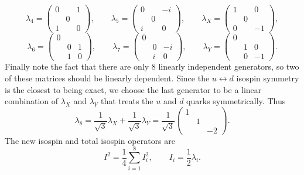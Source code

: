 \begin{equation}
  \lambda_4=\left(\begin{array}{ccc}
            0 &   & 1\\
              & 0 &  \\
            1 &   & 0
            \end{array}\right), \qquad
  \lambda_5=\left(\begin{array}{ccc}
            0 &    & -i \\
              & 0  &    \\
            i &    & 0
            \end{array}\right), \qquad
  \lambda_X=\left(\begin{array}{ccc}
            1 &    & 0 \\
              & 0  &   \\
            0 &    & -1
            \end{array}\right),
\end{equation}
\begin{equation}
  \lambda_6=\left(\begin{array}{ccc}
            0 &   &  \\
              & 0 & 1\\
              & 1 & 0
            \end{array}\right), \qquad
  \lambda_7=\left(\begin{array}{ccc}
            0 &    &   \\
              & 0  & -i\\
              & i  & 0
            \end{array}\right), \qquad
  \lambda_Y=\left(\begin{array}{ccc}
           0  &    &  \\
              & 1  & 0\\
              & 0  & -1 
            \end{array}\right).
\end{equation}
Finally note the fact that there are only 8 linearly independent generators, so
two of these matrices should be linearly dependent. Since the
$u\leftrightarrow d$ isospin symmetry is the closest to being exact, we choose
the last generator to be a linear combination of $\lambda_X$ and $\lambda_Y$
that treats the $u$ and $d$ quarks symmetrically. Thus
\begin{equation}
  \lambda_8=\frac{1}{\sqrt{3}}\lambda_X+\frac{1}{\sqrt{3}}\lambda_Y
           =\frac{1}{\sqrt{3}}\left(\begin{array}{ccc}
            1 &   &   \\
              & 1 &   \\
              &   & -2
            \end{array}\right).
\end{equation}
The new isospin and total isospin operators are
\begin{equation}
  I^2=\frac{1}{4}\sum\limits_{i=1}^8 I_i^2, \qquad I_i=\frac{1}{2}\lambda_i.
\end{equation}

